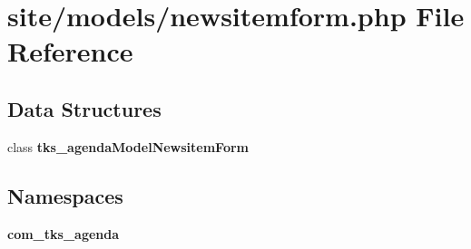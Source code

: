 \section{site/models/newsitemform.php File Reference}
\label{models_2newsitemform_8php}
\subsection*{Data Structures}
\begin{DoxyCompactItemize}
\item 
class \textbf{ tks\+\_\+agenda\+Model\+Newsitem\+Form}
\end{DoxyCompactItemize}
\subsection*{Namespaces}
\begin{DoxyCompactItemize}
\item 
 \textbf{ com\+\_\+tks\+\_\+agenda}
\end{DoxyCompactItemize}
